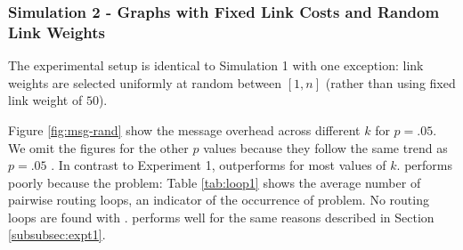 



\subsubsection{Simulation 2 - \er Graphs with Fixed Link Costs and Random Link Weights}
\label{subsec:expt2}


The experimental setup is identical to Simulation 1 with one exception: link weights are selected uniformly at random between $[1,n]$ (rather than using 
fixed link weight of $50$).

Figure \ref{fig:msg-rand} show the message overhead across different $k$ for $p=.05$. We omit the figures for the other $p$ values because they follow the 
same trend as $p=.05$ \cite{Tech}.
In contrast to Experiment 1, \purge outperforms \second for most values of $k$. 
\second performs poorly because the \infinity problem: Table \ref{tab:loop1} shows the average number of pairwise routing loops, an indicator of the occurrence of \infinity problem.
No routing loops are found with \purges. \cpr performs well for the same reasons described in Section \ref{subsubsec:expt1}.  

\begin{figure*}[t]
\centering
{}
\caption{Message overhead for \er graph with link weights selected uniformly random from $[1,100]$}
\label{fig:msg-rand}
\end{figure*}

